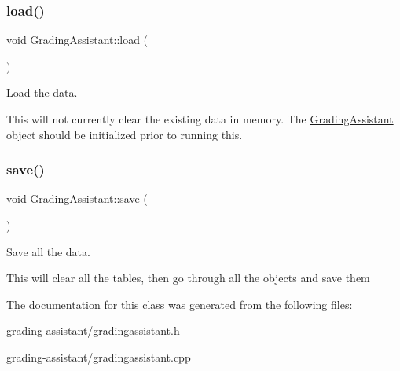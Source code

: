\subsubsection{\texorpdfstring{load()}{load()}}
{\footnotesize\ttfamily void Grading\+Assistant\+::load (\begin{DoxyParamCaption}{ }\end{DoxyParamCaption})}



Load the data. 

This will not currently clear the existing data in memory. The \hyperlink{class_grading_assistant}{Grading\+Assistant} object should be initialized prior to running this. \mbox{\label{class_grading_assistant_ae4d29640f6444cc59d7df5eb73f60115}} 
\subsubsection{\texorpdfstring{save()}{save()}}
{\footnotesize\ttfamily void Grading\+Assistant\+::save (\begin{DoxyParamCaption}{ }\end{DoxyParamCaption})}



Save all the data. 

This will clear all the tables, then go through all the objects and save them 

The documentation for this class was generated from the following files\+:\begin{DoxyCompactItemize}
\item 
grading-\/assistant/gradingassistant.\+h\item 
grading-\/assistant/gradingassistant.\+cpp\end{DoxyCompactItemize}
